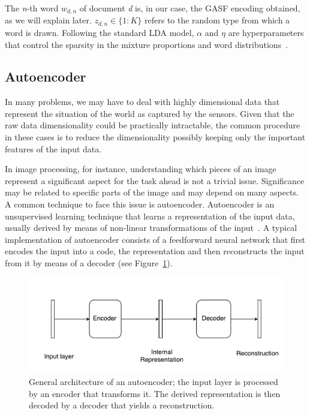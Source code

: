 The \textit{n}-th word $w_{d,n}$ of document \textit{d} is, in our case, the GASF encoding obtained, as we will explain later. $z_{d,n} \in \{1:K\}$ refers to the random type from which a word is drawn. Following the standard LDA model, $\alpha$ and $\eta$ are hyperparameters that control the sparsity in the mixture proportions and word distributions~\cite{smith_mining_2016}.

\subsection{Autoencoder}\label{section:autoencoder}

In many problems, we may have to deal with highly dimensional data that represent the situation of the world as captured by the sensors. Given that the raw data dimensionality could be practically intractable, the common procedure in these cases is to reduce the dimensionality possibly keeping only the important features of the input data.

In image processing, for instance, understanding which pieces of an image represent a significant aspect for the task ahead is not a trivial issue. Significance may be related to specific parts of the image and may depend on many aspects. A common technique to face this issue is {autoencoder}.
Autoencoder is an unsupervised learning technique that learns a representation of the input data, usually derived by means of non-linear transformations of the input~\cite{goodfellow_deep_2016}.
A typical implementation of autoencoder consists of a feedforward neural network that first encodes the input into a code, the representation and then reconstructs the input from it by means of a decoder (see Figure~\ref{fig:autoencoder_architecture}).

\begin{figure}[H]
\centering
\includegraphics[width=.9\columnwidth]{images/05-modeling/autoencoder_architecture}
\caption[Autoencoder general architecture]{General architecture of an autoencoder; the input layer is processed by an encoder that transforms it. The derived representation is then decoded by a decoder that yields a reconstruction.}
\label{fig:autoencoder_architecture}
\end{figure}

